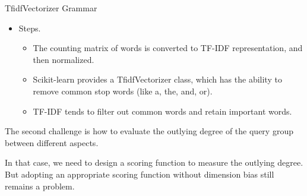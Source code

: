 \documentclass[
 size=14pt,
 paper=smartboard,  %
 mode=present, 		%
 display=slides, 	%
 style=tuliplab,  	%
 pauseslide,
 fleqn,leqno]{powerdot}
\begin{document}
\begin{slide}[toc=,bm=]{TfidfVectorizer Grammar}

  \begin{itemize}
  \item
  Steps.
  
  \begin{itemize}
  \item
  The counting matrix of words is converted to TF-IDF representation, and then normalized.
  \item
  Scikit-learn provides a TfidfVectorizer class, which has the ability to remove common stop words (like a, the, and, or).
  \item
  TF-IDF tends to filter out common words and retain important words.
  
 
  \end{itemize}
  \end{itemize}
  
  \begin{note}
  The second challenge is how to evaluate the outlying degree of
  the query group between different aspects.
  
  In that case,
  we need to design a scoring function to measure the outlying degree.
  But adopting an appropriate scoring function without dimension bias still remains a problem.
  \end{note}
  
  \end{slide}

  



\end{document}
